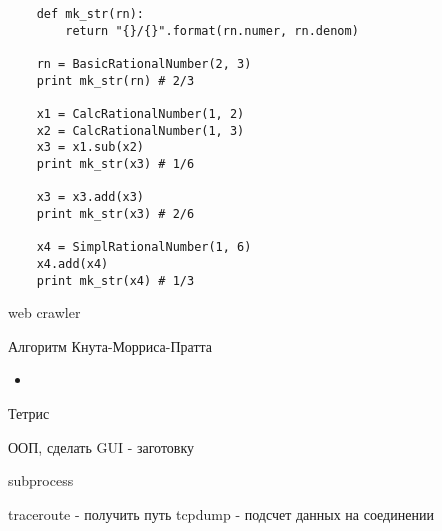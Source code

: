 \documentclass{article}
\begin{document}
\begin{lstlisting}
    def mk_str(rn):
        return "{}/{}".format(rn.numer, rn.denom)

    rn = BasicRationalNumber(2, 3)
    print mk_str(rn) # 2/3

    x1 = CalcRationalNumber(1, 2)
    x2 = CalcRationalNumber(1, 3)
    x3 = x1.sub(x2)
    print mk_str(x3) # 1/6

    x3 = x3.add(x3)
    print mk_str(x3) # 2/6

    x4 = SimplRationalNumber(1, 6)
    x4.add(x4)
    print mk_str(x4) # 1/3
\end{lstlisting}

\newpage

\begin{center} web crawler \end{center}
\newpage

\begin{center} Алгоритм Кнута-Морриса-Пратта \end{center}
\begin{itemize}
    \item 
\end{itemize}
\newpage

\begin{center} Тетрис \end{center}
ООП, сделать GUI - заготовку
\newpage

\begin{center} subprocess \end{center}
traceroute - получить путь
tcpdump - подсчет данных на соединении
\newpage

\end{document}
